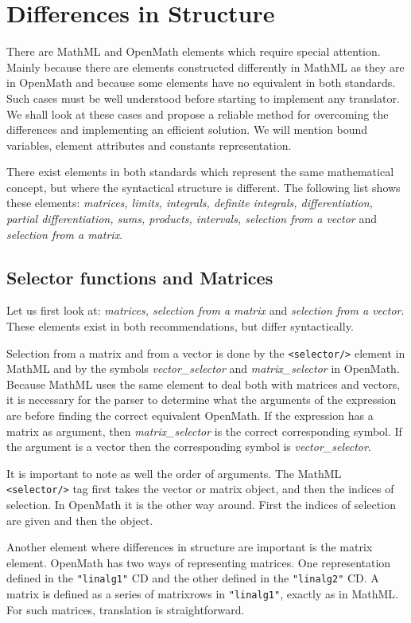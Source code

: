 \section{Differences in Structure}

There are MathML and OpenMath elements which require special attention.
Mainly because there are elements constructed differently in MathML as
they are in OpenMath and because some elements have no equivalent in
both standards. Such cases must be well understood before starting to
implement any translator. We shall look at these cases and propose a
reliable method for overcoming the differences and implementing an
efficient solution. We will mention bound variables, element attributes
and constants representation.

There exist elements in both standards which represent the same
mathematical concept, but where the syntactical structure is different.
The following list shows these elements: {\it matrices, limits,
integrals, definite integrals, differentiation, partial
differentiation, sums, products, intervals, selection from a vector}
and {\it
selection from a matrix}.

\subsection{Selector functions and Matrices}

Let us first look at: {\it matrices, selection from a matrix} and {\it
selection from a vector}.  These elements exist in both
recommendations, but differ syntactically.

Selection from a matrix and from a vector is done by the
\verb|<selector/>| element in MathML and by the symbols {\it
vector\_selector} and {\it matrix\_selector} in OpenMath. Because
MathML uses the same element to deal both with matrices and vectors, it
is necessary for the parser to determine what the arguments of the
expression are before finding the correct equivalent OpenMath. If the
expression has a matrix as argument, then {\it matrix\_selector} is the
correct corresponding symbol. If the argument is a vector then the
corresponding symbol is {\it vector\_selector}.

It is important to note as well the order of arguments. The MathML
\verb|<selector/>| tag first takes the vector or matrix object, and
then the indices of selection. In OpenMath it is the other way around.
First the indices of selection are given and then the object.

Another element where differences in structure are important is the
matrix element.  OpenMath has two ways of representing matrices. One
representation defined in the \verb|"linalg1"| CD and the other defined
in the \verb|"linalg2"| CD. A matrix is defined as a series of
matrixrows in \verb|"linalg1"|, exactly as in MathML. For such
matrices, translation is straightforward.

